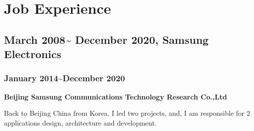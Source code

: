 \documentclass{article}
\begin{document}
\section{Job Experience}
\subsection{March 2008\~{} December 2020, Samsung Electronics}

\subsubsection{January 2014\~{}December 2020}
\textbf{Beijing Samsung Communications Technology Research Co.,Ltd}

Back to Beijing China from Korea, I led two projects, and, I am responsible for 2 applications design, architecture and development.
\end{document}
